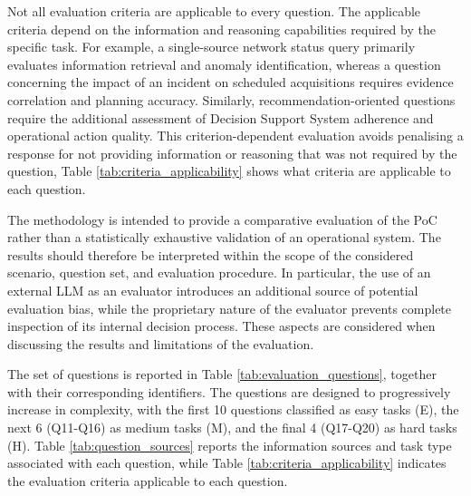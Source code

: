 Not all evaluation criteria are applicable to every question. The applicable criteria depend on the information and reasoning capabilities required by the specific task. For example, a single-source network status query primarily evaluates information retrieval and anomaly identification, whereas a question concerning the impact of an incident on scheduled acquisitions requires evidence correlation and planning accuracy. Similarly, recommendation-oriented questions require the additional assessment of Decision Support System adherence and operational action quality. This criterion-dependent evaluation avoids penalising a response for not providing information or reasoning that was not required by the question, Table \ref{tab:criteria_applicability} shows what criteria are applicable to each question.


The methodology is intended to provide a comparative evaluation of the PoC rather than a statistically exhaustive validation of an operational system. The results should therefore be interpreted within the scope of the considered scenario, question set, and evaluation procedure. In particular, the use of an external LLM as an evaluator introduces an additional source of potential evaluation bias, while the proprietary nature of the evaluator prevents complete inspection of its internal decision process. These aspects are considered when discussing the results and limitations of the evaluation.

The set of questions is reported in Table \ref{tab:evaluation_questions}, together with their corresponding identifiers. The questions are designed to progressively increase in complexity, with the first 10 questions classified as easy tasks (E), the next 6 (Q11-Q16) as medium tasks (M), and the final 4 (Q17-Q20) as hard tasks (H). Table \ref{tab:question_sources} reports the information sources and task type associated with each question, while Table \ref{tab:criteria_applicability} indicates the evaluation criteria applicable to each question.



